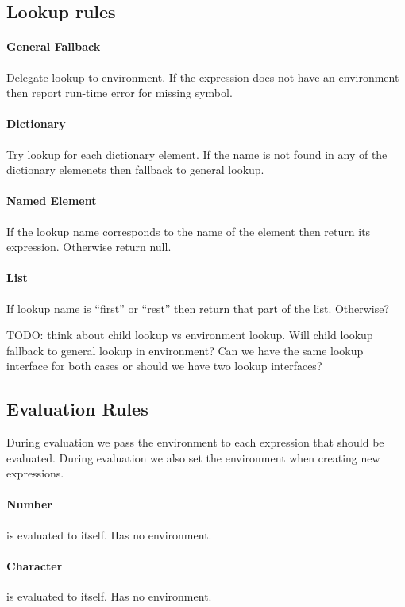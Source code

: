 \documentclass[a4paper,12pt]{article}
\begin{document}
\clearpage

\subsection{Lookup rules}

\paragraph{General Fallback}
Delegate lookup to environment. If the expression does not have an environment then report run-time error for missing symbol.

\paragraph{Dictionary}
Try lookup for each dictionary element. If the name is not found in any of the dictionary elemenets then fallback to general lookup.

\paragraph{Named Element}
If the lookup name corresponds to the name of the element then return its expression. Otherwise return null.

\paragraph{List}
If lookup name is ``first'' or ``rest'' then return that part of the list. Otherwise?

TODO: think about child lookup vs environment lookup. Will child lookup fallback to general lookup in environment? Can we have the same lookup interface for both cases or should we have two lookup interfaces?

\subsection{Evaluation Rules}
During evaluation we pass the environment to each expression that should be evaluated. During evaluation we also set the environment when creating new expressions.

\paragraph{Number} is evaluated to itself. Has no environment.
\paragraph{Character} is evaluated to itself. Has no environment.
\end{document}
